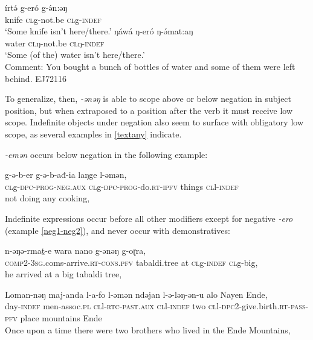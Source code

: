 	\ea 
	\gll	írtə́	g-eró g-ə́n:əŋ\\
				knife 	\textsc{cl}g-not.be \textsc{cl}g-\textsc{indef}\\
		\glt 	‘Some knife isn't here/there.’ 
		\gll	ŋáwá	ŋ-eró ŋ-ə́mat:aŋ\\
				water 	\textsc{cl}ŋ-not.be \textsc{cl}ŋ-\textsc{indef}\\
		\glt 	‘Some (of the) water isn't here/there.’\\
				Comment: You bought a bunch of bottles of water and some of them were left behind.  \hfill EJ72116
	\z 

To generalize, then, \textit{-ənəŋ} is able to scope above or below negation in subject position, but when extraposed to a position after the verb it must receive low scope. Indefinite objects under negation also seem to surface with obligatory low scope, as several examples in \ref{textany} indicate.


\textit{-emən} occurs below negation in the following example:

\ea \gll  g-ə-b-er g-ə-b-ađ-ia laŋge l-əmən,\\
\textsc{cl}g-\textsc{dpc}-\textsc{prog}-\textsc{neg.aux} \textsc{cl}g-\textsc{dpc}-\textsc{prog}-do.\textsc{rt}-\textsc{ipfv} things \textsc{cl}l-\textsc{indef}\\
\glt not doing any cooking,
\z





Indefinite expressions occur before all other modifiers except for negative \textit{-ero} (example \ref{neg1-neg2}), and never occur with demonstratives:

\ea \gll n-ǝŋǝ-rmaṯ-e wara nano g-ǝnǝŋ g-oɽra,\\
\textsc{comp}2-3\textsc{sg}.coms-arrive.\textsc{rt}-\textsc{cons}.\textsc{pfv} tabaldi.tree at \textsc{cl}g-\textsc{indef} \textsc{cl}g-big,\\
\glt he arrived at a big tabaldi tree,
\z 

\ea \gll Loman-nǝŋ maj-anda l-a-fo l-ǝmǝn ndǝjan l-ǝ-lǝŋ-ǝn-u alo Nayen Ende,\\
day-\textsc{indef} men-assoc.\textsc{pl} \textsc{cl}l-\textsc{rtc}-\textsc{past.aux} \textsc{cl}l-\textsc{indef} two \textsc{cl}l-\textsc{dpc}2-give.birth.\textsc{rt}-\textsc{pass}-\textsc{pfv} place mountains Ende\\
\glt Once upon a time there were two brothers who lived in the Ende Mountains,
\z 

